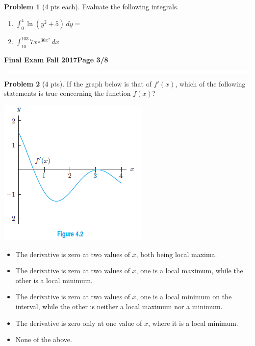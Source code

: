 \documentclass[12pt]{article}
\makeatletter
\theoremstyle{definition}
\newtheorem{problem}{Problem}
\newcommand*{\radiobutton}{%
  \@ifstar{\@radiobutton0}{\@radiobutton1}%
}
\newcommand*{\@radiobutton}[1]{%
  \begin{tikzpicture}
    \pgfmathsetlengthmacro\radius{height("X")/2}
    \draw[radius=\radius] circle;
    \ifcase#1 \fill[radius=.6*\radius] circle;\fi
  \end{tikzpicture}%
}
\makeatother
\begin{document}
\begin{problem}[4 pts each]
Evaluate the following integrals.
\begin{enumerate}
\item $\displaystyle{\int_{0}^{4} \ln(y^2 + 5) \, dy} = $
\item $\displaystyle{\int_{10}^{103} 7xe^{30x^2}\, dx = }$
\vspace{7cm}
\end{enumerate}
\end{problem}

\newpage

\hfill{\large\bf Final Exam}\hfill{\large\bf
  Fall 2017}\hfill{\large\bf Page 3/8}\hrule

\bigskip

\begin{problem}[4 pts]
If the graph below is that of $f'(x)$, which of the following statements is true concerning the function $f(x)$?
\begin{multicols}{2}
\includegraphics{3graph2}
\vspace{2cm}

\begin{itemize}
\item[\radiobutton] The derivative is zero at two values of $x$, both being local maxima.
\item[\radiobutton] The derivative is zero at two values of $x$, one is a local maximum, while the other is a local minimum.
\item[\radiobutton] The derivative is zero at two values of $x$, one is a local minimum on the interval, while the other is neither a local maximum nor a minimum.
\item[\radiobutton] The derivative is zero only at one value of $x$, where it is a local minimum.
\item[\radiobutton] None of the above.
\end{itemize}
\end{multicols}
\end{problem}
\end{document}
